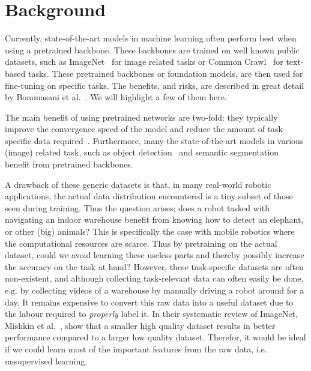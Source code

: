 \chapter{Background}
Currently, state-of-the-art models in machine learning often perform best when using a pretrained backbone. These backbones are trained on well known public datasets, such as ImageNet~\cite{deng2009imagenet} for image related tasks or Common Crawl~\cite{commoncrawl} for text-based tasks. These pretrained backbones or foundation models, are then used for fine-tuning on specific tasks. The benefits, and risks, are described in great detail by Bommasani et al.~\cite{DBLP:journals/corr/abs-2108-07258}. We will highlight a few of them here.

The main benefit of using pretrained networks are two-fold: they typically improve the convergence speed of the model and reduce the amount of task-specific data required~\cite{donahue2014decaf,zeiler2014visualizing}. Furthermore, many the state-of-the-art models in various (image) related task, such as object detection~\cite{liu2016ssd,redmon2016you} and semantic segmentation~\cite{orsic2019defense,girshick2014rich} benefit from pretrained backbones.

A drawback of these generic datasets is that, in many real-world robotic applications, the actual data distribution encountered is a tiny subset of those seen during training. Thus the question arises; does a robot tasked with navigating an indoor warehouse benefit from knowing how to detect an elephant, or other (big) animals? This is specifically the case with mobile robotics where the computational resources are scarce. Thus by pretraining on the actual dataset, could we avoid learning these useless parts and thereby possibly increase the accuracy on the task at hand? However, these task-specific datasets are often non-existent, and although collecting task-relevant data can often easily be done, e.g. by collecting videos of a warehouse by manually driving a robot around for a day. It remains expensive to convert this raw data into a useful dataset due to the labour required to \emph{properly} label it.
In their systematic review of ImageNet, Mishkin et al.~\cite{MISHKIN201711}, show that a smaller high quality dataset results in better performance compared to a larger low quality dataset. Therefor, it would be ideal if we could learn most of the important features from the raw data, i.e. unsupervised learning.

